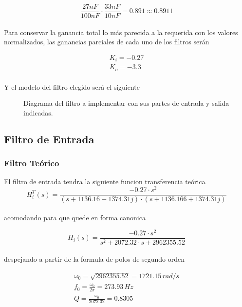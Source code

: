 \documentclass[10pt,a4paper]{article}
\begin{document}
    \[ \frac{27nF}{100nF} \cdot \frac{33nF}{10nF} = 0.891 \approx  0.8911 \] \\

    Para conservar la ganancia total lo más parecida a la requerida con los valores normalizados, las ganancias parciales de cada uno de los filtros serán

    \begin{gather*}
        K_{i} = -0.27\\
        K_{o} = -3.3\\
    \end{gather*}

    Y el modelo del filtro elegido será el siguiente

    \begin{figure}[H]
        \centering
        \scalebox{1.2}{}
        \caption{Diagrama del filtro a implementar con sus partes de entrada y salida indicadas.}
        \label{fig}
    \end{figure}


    \subsection{Filtro de Entrada}\label{subsec:filtro-de-entrada}

    \subsubsection{Filtro Teórico}

    El filtro de entrada tendra la siguiente funcion transferencia teórica \\

    \[H_{i}^{T}(s)=\frac{-0.27 \cdot s^{2}}{(s + 1136.16 - 1374.31j) \cdot (s + 1136.166 + 1374.31j)}\] \\

    acomodando para que quede en forma canonica

    \[H_i(s)=\frac{-0.27 \cdot s^{2}}{s^{2}+2072.32 \cdot s + 2962355.52}\] \\

    despejando a partir de la formula de polos de segundo orden

    \begin{gather*}
        \omega_{0}= \sqrt{2962355.52} = 1721.15 \, rad/s\\
        f_{0}= \frac{\omega_{0}}{2\pi} = 273.93 \, Hz\\
        Q= \frac{\omega_0}{2072.32} = 0.8305\\
    \end{gather*}
\end{document}
